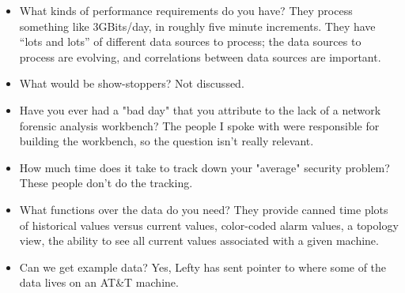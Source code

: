 \documentclass{article}
\begin{document}
\begin{itemize}
\item What kinds of performance requirements do you have?  
They process something like 3GBits/day, in roughly five minute
increments.  They have ``lots and lots'' of different data sources to
process; the data sources to process are evolving, and correlations
between data sources are important.

\item  What would be show-stoppers?  Not discussed.

\item Have you ever had a "bad day" that you attribute to the lack of
  a network forensic analysis workbench?
The people I spoke with were responsible for building the workbench,
so the question isn't really relevant.

\item How much time does it take to track down your "average" security problem?
These people don't do the tracking.

\item What functions over the data do you need?
They provide canned time plots of historical values versus current
values, color-coded alarm values, a topology view, the ability to see
all current values associated with a given machine.

\item Can we get example data?
Yes, Lefty has sent pointer to where some of the data lives on an
AT\&T machine.
\end{itemize}
\end{document}
